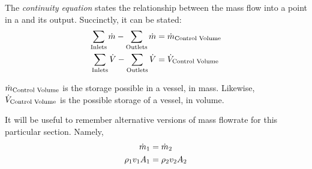 \begin{definition}\label{def:Continuity_Equation}
  The \emph{continuity equation} states the relationship between the mass flow into a point in a  and its output.
  Succinctly, it can be stated:
  \begin{equation}\label{eq:Continuity_Equation}
    \begin{aligned}
      \sum\limits_{\text{Inlets}} \dot{m} - \sum\limits_{\text{Outlets}} \dot{m} &= \dot{m}_{\text{Control Volume}} \\
      \sum\limits_{\text{Inlets}} \dot{V} - \sum\limits_{\text{Outlets}} \dot{V} &= \dot{V}_{\text{Control Volume}}
    \end{aligned}
  \end{equation}

  \begin{description}[noitemsep]
  \item $\dot{m}_{\text{Control Volume}}$ is the storage possible in a vessel, in mass.
    Likewise, $\dot{V}_{\text{Control Volume}}$ is the possible storage of a vessel, in volume.
  \end{description}

  \begin{remark}\label{rmk:Alternative_Mass_Flowrate_Defns}
    It will be useful to remember alternative versions of mass flowrate for this particular section.
    Namely,
    \begin{align*}
      \dot{m}_{1} &= \dot{m}_{2} \\
      \rho_{1} v_{1} A_{1} &= \rho_{2} v_{2} A_{2}
    \end{align*}
  \end{remark}
\end{definition}

